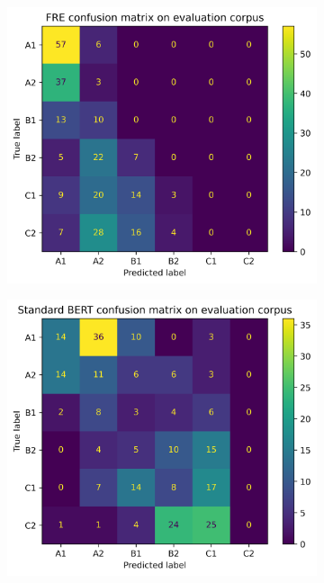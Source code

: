 \documentclass[11pt,a4paper]{article}
\begin{document}
\begin{figure}
  \centering
  \begin{subfigure}{0.45\textwidth}
    \centering
    \includegraphics[width=1\textwidth]{figures/confusion-matrix-fre.png}
  \end{subfigure}%
  \begin{subfigure}{0.45\textwidth}
    \centering
    \includegraphics[width=1\textwidth]{figures/confusion-matrix-standard-bert.png}

\end{subfigure}
\end{figure}
\end{document}
